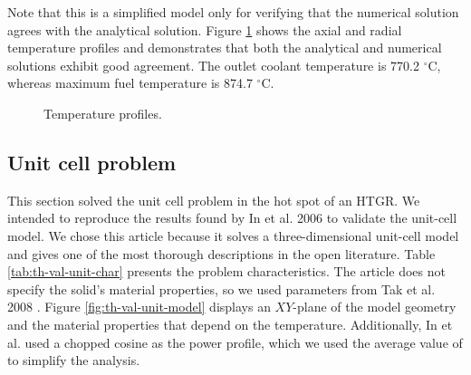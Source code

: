 Note that this is a simplified model only for verifying that the numerical solution agrees with the analytical solution.
Figure \ref{fig:th-ver-results} shows the axial and radial temperature profiles and demonstrates that both the analytical and numerical solutions exhibit good agreement.
The outlet coolant temperature is 770.2 $^{\circ}$C, whereas maximum fuel temperature is 874.7 $^{\circ}$C.

\begin{figure}[htbp!]
	\centering
	\hfill
    \caption{Temperature profiles.}
	\label{fig:th-ver-results}
\end{figure}

\subsection{Unit cell problem}
\label{sec:unitcell}

This section solved the unit cell problem in the hot spot of an HTGR.
We intended to reproduce the results found by In et al. 2006 \cite{in_three-dimensional_2006} to validate the unit-cell model.
We chose this article because it solves a three-dimensional unit-cell model and gives one of the most thorough descriptions in the open literature.
Table \ref{tab:th-val-unit-char} presents the problem characteristics.
The article does not specify the solid's material properties, so we used parameters from Tak et al. 2008 \cite{tak_numerical_2008}.
Figure \ref{fig:th-val-unit-model} displays an $XY$-plane of the model geometry and the material properties that depend on the temperature.
Additionally, In et al. used a chopped cosine as the power profile, which we used the average value of to simplify the analysis.

